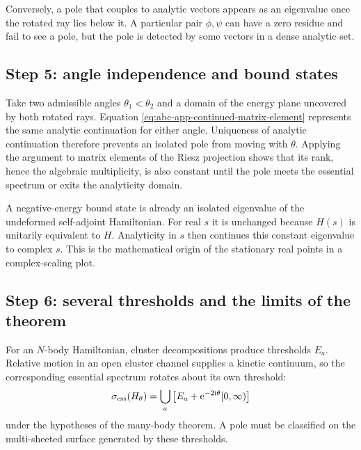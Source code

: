 Conversely, a pole that couples to analytic vectors appears as an eigenvalue
once the rotated ray lies below it.  A particular pair $\phi,\psi$ can have a
zero residue and fail to see a pole, but the pole is detected by some vectors
in a dense analytic set.

\subsection*{Step 5: angle independence and bound states}

Take two admissible angles $\theta_1<\theta_2$ and a domain of the energy
plane uncovered by both rotated rays.  Equation
\eqref{eq:abc-app-continued-matrix-element} represents the same analytic
continuation for either angle.  Uniqueness of analytic continuation therefore
prevents an isolated pole from moving with $\theta$.  Applying the argument
to matrix elements of the Riesz projection shows that its rank, hence the
algebraic multiplicity, is also constant until the pole meets the essential
spectrum or exits the analyticity domain.

A negative-energy bound state is already an isolated eigenvalue of the
undeformed self-adjoint Hamiltonian.  For real $s$ it is unchanged because
$H(s)$ is unitarily equivalent to $H$.  Analyticity in $s$ then continues this
constant eigenvalue to complex $s$.  This is the mathematical origin of the
stationary real points in a complex-scaling plot.

\subsection*{Step 6: several thresholds and the limits of the theorem}

For an $N$-body Hamiltonian, cluster decompositions produce thresholds
$E_a$.  Relative motion in an open cluster channel supplies a kinetic
continuum, so the corresponding essential spectrum rotates about its own
threshold:
\begin{equation}
  \sigma_{\mathrm{ess}}(H_\theta)
  =\bigcup_a\left[E_a+\mathrm{e}^{-2\mathrm{i}\theta}[0,\infty)\right]
  \label{eq:abc-app-many-thresholds}
\end{equation}
under the hypotheses of the many-body theorem.  A pole must be classified on
the multi-sheeted surface generated by these thresholds.

